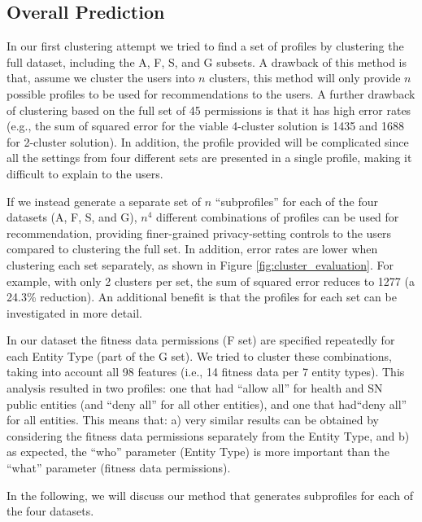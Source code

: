 \subsection{Overall Prediction}
In our first clustering attempt we tried to find a set of profiles by clustering the full dataset, including the A, F, S, and G subsets.
A drawback of this method is that, assume we cluster the users into $n$ clusters, this  method will  only provide $n$ possible profiles to be used for recommendations to the users. A further drawback of clustering based on the full set of 45 permissions is that it has high error rates (e.g., the sum of squared error for the viable 4-cluster solution is 1435 and 1688 for 2-cluster solution). In addition, the profile provided will be complicated since all the settings from four different sets are presented in a single profile, making it difficult to explain to the users.

If we instead generate a separate set of $n$ ``subprofiles'' for each of the four datasets (A, F, S, and G), $n^4$  different combinations of profiles can be used for recommendation, providing finer-grained privacy-setting controls to the users compared to clustering the full set. In addition, error rates are lower when clustering each set separately, as shown in Figure \ref{fig:cluster_evaluation}. For example, with only 2 clusters per set, the sum of squared error reduces to 1277 (a 24.3\% reduction). %
An additional benefit is that the profiles for each set can be investigated in more detail. 


In our dataset the fitness data permissions (F set) are specified repeatedly for each Entity Type (part of the G set). We tried to cluster these combinations, taking into account all 98 features (i.e., 14 fitness data per 7 entity types). This analysis resulted in two profiles: one that had ``allow all'' for health and SN public entities (and ``deny all'' for all other entities), and one that had``deny all'' for all entities. This means that: a) very similar results can be obtained by considering the fitness data permissions separately from the Entity Type, and b) as expected, the ``who'' parameter (Entity Type) is more important than the ``what'' parameter (fitness data permissions). 

In the following, we will discuss our method that generates subprofiles for each of the four datasets.


